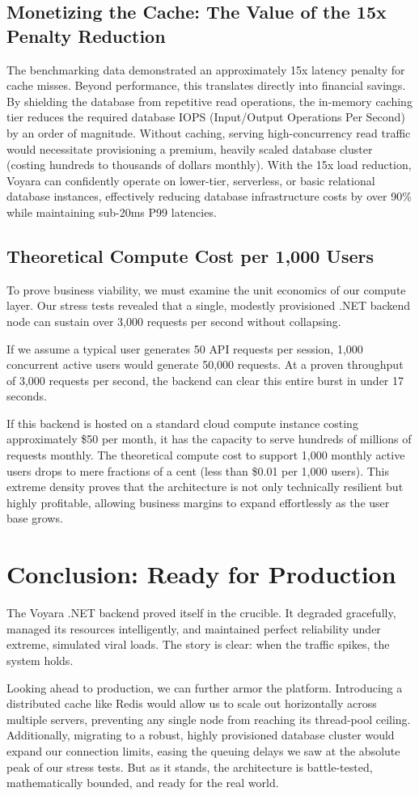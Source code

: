 \subsection{Monetizing the Cache: The Value of the 15x Penalty Reduction}
The benchmarking data demonstrated an approximately 15x latency penalty for cache misses. Beyond performance, this translates directly into financial savings. By shielding the database from repetitive read operations, the in-memory caching tier reduces the required database IOPS (Input/Output Operations Per Second) by an order of magnitude. Without caching, serving high-concurrency read traffic would necessitate provisioning a premium, heavily scaled database cluster (costing hundreds to thousands of dollars monthly). With the 15x load reduction, Voyara can confidently operate on lower-tier, serverless, or basic relational database instances, effectively reducing database infrastructure costs by over 90\% while maintaining sub-20ms P99 latencies.

\subsection{Theoretical Compute Cost per 1,000 Users}
To prove business viability, we must examine the unit economics of our compute layer. Our stress tests revealed that a single, modestly provisioned .NET backend node can sustain over 3,000 requests per second without collapsing. 

If we assume a typical user generates 50 API requests per session, 1,000 concurrent active users would generate 50,000 requests. At a proven throughput of 3,000 requests per second, the backend can clear this entire burst in under 17 seconds. 

If this backend is hosted on a standard cloud compute instance costing approximately \$50 per month, it has the capacity to serve hundreds of millions of requests monthly. The theoretical compute cost to support 1,000 monthly active users drops to mere fractions of a cent (less than \$0.01 per 1,000 users). This extreme density proves that the architecture is not only technically resilient but highly profitable, allowing business margins to expand effortlessly as the user base grows.

\section{Conclusion: Ready for Production}
The Voyara .NET backend proved itself in the crucible. It degraded gracefully, managed its resources intelligently, and maintained perfect reliability under extreme, simulated viral loads. The story is clear: when the traffic spikes, the system holds.

Looking ahead to production, we can further armor the platform. Introducing a distributed cache like Redis would allow us to scale out horizontally across multiple servers, preventing any single node from reaching its thread-pool ceiling. Additionally, migrating to a robust, highly provisioned database cluster would expand our connection limits, easing the queuing delays we saw at the absolute peak of our stress tests. But as it stands, the architecture is battle-tested, mathematically bounded, and ready for the real world.

